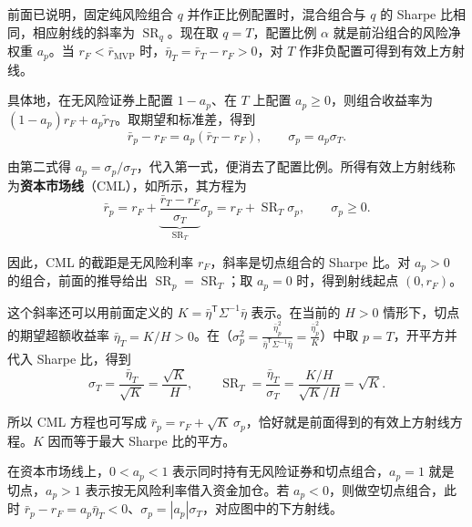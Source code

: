 前面已说明，固定纯风险组合 $q$ 并作正比例配置时，混合组合与 $q$ 的 Sharpe 比相同，相应射线的斜率为 $\operatorname{SR}_q$。现在取 $q=T$，配置比例 $\alpha$ 就是前沿组合的风险净权重 $a_p$。当 $r_F<\bar r_{\mathrm{MVP}}$ 时，$\bar\eta_T=\bar r_T-r_F>0$，对 $T$ 作非负配置可得到有效上方射线。

具体地，在无风险证券上配置 $1-a_p$、在 $T$ 上配置 $a_p\ge0$，则组合收益率为 $(1-a_p)r_F+a_p\widetilde r_T$。取期望和标准差，得到
\[
 \bar r_p-r_F=a_p(\bar r_T-r_F),\qquad
 \sigma_p=a_p\sigma_T.
\]

由第二式得 $a_p=\sigma_p/\sigma_T$，代入第一式，便消去了配置比例。\hypertarget{wj-capital-market-line}{}所得有效上方射线称为\textbf{资本市场线}（CML），如所示，其方程为
\begin{equation*}
 \bar r_p=r_F+\underbrace{\frac{\bar r_T-r_F}{\sigma_T}}_{\operatorname{SR}_T}\sigma_p
 =r_F+\operatorname{SR}_T\sigma_p,\qquad \sigma_p\ge0.
 \tag{12.XV}\label{eq:wj-12-capital-market-line}
\end{equation*}

因此，CML 的截距是无风险利率 $r_F$，斜率是切点组合的 Sharpe 比。对 $a_p>0$ 的组合，前面的推导给出 $\operatorname{SR}_p=\operatorname{SR}_T$；取 $a_p=0$ 时，得到射线起点 $(0,r_F)$。

这个斜率还可以用前面定义的 $K=\bar\eta^{\mathsf T}\Sigma^{-1}\bar\eta$ 表示。在当前的 $H>0$ 情形下，切点的期望超额收益率 $\bar\eta_T=K/H>0$。在（$\sigma_p^2=\frac{\bar\eta_p^2}{\bar\eta^{\mathsf T}\Sigma^{-1}\bar\eta}=\frac{\bar\eta_p^2}{K}$）中取 $p=T$，开平方并代入 Sharpe 比，得到
\[
 \sigma_T=\frac{\bar\eta_T}{\sqrt K}=\frac{\sqrt K}{H},
 \qquad
 \operatorname{SR}_T=\frac{\bar\eta_T}{\sigma_T}
 =\frac{K/H}{\sqrt K/H}=\sqrt K.
\]

所以 CML 方程也可写成 $\bar r_p=r_F+\sqrt K\,\sigma_p$，恰好就是前面得到的有效上方射线方程。$K$ 因而等于最大 Sharpe 比的平方。

\begin{center}
\begin{minipage}{\linewidth}
\centering
\renewcommand{\thewjFigure}{\thechapter.S\arabic{wjFigure}}%
%
\par
{}
\end{minipage}
\end{center}

在资本市场线上，$0<a_p<1$ 表示同时持有无风险证券和切点组合，$a_p=1$ 就是切点，$a_p>1$ 表示按无风险利率借入资金加仓。若 $a_p<0$，则做空切点组合，此时 $\bar r_p-r_F=a_p\bar\eta_T<0$、$\sigma_p=|a_p|\sigma_T$，对应图中的下方射线。

